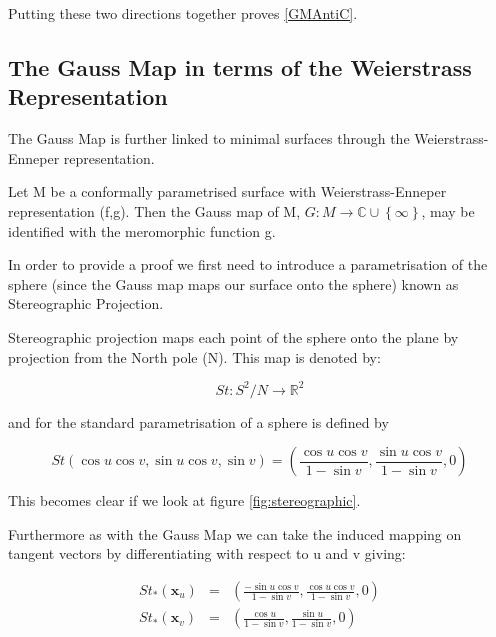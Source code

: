 Putting these two directions together proves \ref{GMAntiC}.


\subsection{The Gauss Map in terms of the Weierstrass \\ Representation}

The Gauss Map is further linked to minimal surfaces through the Weierstrass-Enneper representation.
\begin{theorem}
Let M be a conformally parametrised surface with Weierstrass-Enneper representation (f,g). Then the Gauss map of M, $G: M \rightarrow \mathbb C \cup \left\{ \infty \right\}$, may be identified with the meromorphic function g.
\end{theorem}

In order to provide a proof we first need to introduce a parametrisation of the sphere (since the Gauss map maps our surface onto the sphere) known as Stereographic Projection.

\begin{definition}
Stereographic projection maps each point of the sphere onto the plane by projection from the North pole (N). This map is denoted by:

\begin{displaymath}
St: S^2/{N} \rightarrow \mathbb R^2
\end{displaymath}

and for the standard parametrisation of a sphere is defined by 

\begin{displaymath}
St(\cos u \cos v, \sin u \cos v, \sin v) = \left(\frac{\cos u \cos v}{1-\sin v}, \frac{\sin u \cos v}{1-\sin v}, 0 \right)
\end{displaymath}
\end{definition}

This becomes clear if we look at figure \ref{fig:stereographic}.

Furthermore as with the Gauss Map we can take the induced mapping on tangent vectors by differentiating with respect to u and v giving:

\begin{eqnarray}
\nonumber
St_*(\mathbf x_u) &=& \left(\frac{-\sin u \cos v}{1-\sin v},\frac{\cos u \cos v}{1-\sin v}, 0 \right) \\
\nonumber
St_*(\mathbf x_v) &=& \left(\frac{\cos u}{1-\sin v},\frac{\sin u}{1-\sin v}, 0 \right)
\end{eqnarray}

